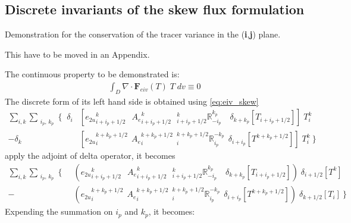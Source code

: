 \documentclass[../main/NEMO_manual]{subfiles}
\begin{document}
\newpage

\subsection{Discrete invariants of the skew flux formulation}
\label{subsec:eiv_skew}

Demonstration for the conservation of the tracer variance in the (\textbf{i},\textbf{j}) plane. 

This have to be moved in an Appendix.

The continuous property to be demonstrated is:
\begin{align*}
  \int_D \nabla \cdot \textbf{F}_{eiv}(T) \; T \;dv  \equiv 0
\end{align*}
The discrete form of its left hand side is obtained using \autoref{eq:eiv_skew}
\begin{align*}
  \sum\limits_{i,k} \sum_{\substack{i_p,\,k_p}}  \Biggl\{   \;\;
  \delta_i  &\left[
              {e_{2u}}_{i+i_p+1/2}^{k}                                  \;\ \ {A_{e}}_{i+i_p+1/2}^{k}
              \ \ \ { _{i+i_p+1/2}^k \mathbb{R}_{-i_p}^{k_p} }   \quad \delta_{k+k_p}[T_{i+i_p+1/2}]
              \right] \; T_i^k      \\
  - \delta_k &\left[
               {e_{2u}}_i^{k+k_p+1/2}                                     \ \ {A_{e}}_i^{k+k_p+1/2}
               \ \ { _i^{k+k_p+1/2} \mathbb{R}_{i_p}^{-k_p} }   \ \ \delta_{i+i_p}[T^{k+k_p+1/2}]
               \right] \; T_i^k      \         \Biggr\}
\end{align*}
apply the adjoint of delta operator, it becomes
\begin{align*}
  \sum\limits_{i,k} \sum_{\substack{i_p,\,k_p}}  \Biggl\{   \;\;
  &\left(
    {e_{2u}}_{i+i_p+1/2}^{k}                                  \;\ \ {A_{e}}_{i+i_p+1/2}^{k}
    \ \ \ { _{i+i_p+1/2}^k \mathbb{R}_{-i_p}^{k_p} }   \quad \delta_{k+k_p}[T_{i+i_p+1/2}]
    \right) \; \delta_{i+1/2}[T^{k}]      \\
  - &\left(
      {e_{2u}}_i^{k+k_p+1/2}                                     \ \ {A_{e}}_i^{k+k_p+1/2}
      \ \ { _i^{k+k_p+1/2} \mathbb{R}_{i_p}^{-k_p} }   \ \ \delta_{i+i_p}[T^{k+k_p+1/2}]
      \right) \; \delta_{k+1/2}[T_{i}]       \         \Biggr\}
\end{align*}
Expending the summation on $i_p$ and $k_p$, it becomes:
\end{document}
